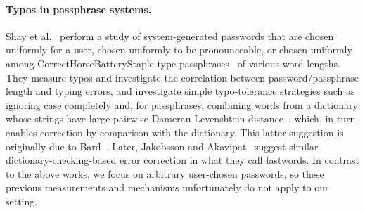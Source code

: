 


\paragraph{Typos in passphrase systems.}
Shay et al.~\cite{shay2012correct} perform a study of system-generated
passwords that are chosen uniformly for a user, chosen uniformly to be
pronounceable, or chosen uniformly among CorrectHorseBatteryStaple-type
passphrases~\cite{xkcd} of various word lengths. They measure typos and
investigate the correlation between password/passphrase length and typing errors,
and investigate simple typo-tolerance strategies such as ignoring case
completely and, for passphrases, combining words from a dictionary whose strings
have large pairwise Damerau-Levenshtein
distance~\cite{levenshtein1966binary,damerau1964technique}, which, in turn,
enables correction by comparison with the dictionary.  This latter suggestion is
originally due to Bard~\cite{bard2007spelling}. Later, Jakobsson and
Akavipat~\cite{jakobsson2012rethinking} suggest similar dictionary-checking-based error correction in what they call fastwords.
In contrast to the above works, we focus on arbitrary user-chosen passwords, so these previous measurements and mechanisms unfortunately do not apply to our setting.


